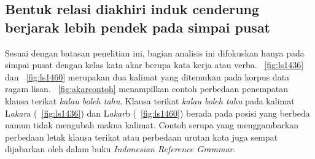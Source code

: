 \documentclass[10pt, a4paper, conference, compsocconf]{IEEEtran}
\begin{document}
\subsection{Bentuk relasi diakhiri induk cenderung berjarak lebih pendek pada simpai pusat}
Sesuai dengan batasan penelitian ini, bagian analisis ini difokuskan hanya pada simpai pusat dengan kelas kata akar berupa kata kerja atau verba. \pic~\ref{fig:ls1436} dan \pic~\ref{fig:ls1460} merupakan dua kalimat yang ditemukan pada korpus data ragam lisan. \pic~\ref{fig:akarcontoh} menampilkan contoh perbedaan penempatan klausa terikat \textit{kalau boleh tahu}. Klausa terikat \textit{kalau boleh tahu} pada kalimat L\textit{akar}a (\pic~\ref{fig:ls1436}) dan L\textit{akar}b (\pic~\ref{fig:ls1460}) berada pada posisi yang berbeda namun tidak mengubah makna kalimat. Contoh serupa yang menggambarkan perbedaan letak klausa terikat atau perbedaan urutan kata juga sempat dijabarkan oleh \citet[hlm. 209]{sneddon2010indonesian} dalam buku \textit{Indonesian Reference Grammar}.
\end{document}
